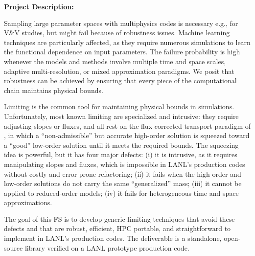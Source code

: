 \documentclass[12pt,twoside]{paper}
\begin{document}
\textbf{Project Description:} 

\vspace*{0.5\baselineskip}

Sampling large parameter spaces with multiphysics codes is necessary e.g.,
for V\&V studies, but might fail because of robustness issues. Machine
learning techniques are particularly affected, as they require numerous
simulations to learn the functional dependence on input parameters. The
failure probability is high whenever the models and methods involve
multiple time and space scales, adaptive multi-resolution, or mixed
approximation paradigms. We posit that robustness can be achieved by
ensuring that every piece of the computational chain maintains physical
bounds.

\vspace*{0.5\baselineskip}

Limiting is the common tool for maintaining physical bounds in simulations.
Unfortunately, most known limiting are specialized and intrusive: they
require adjusting slopes or fluxes, and all rest on the flux-corrected
transport paradigm of \cite{Boris_Book_JCP_1973, Zalesak_1979}, in which a
“non-admissible” but accurate high-order solution is squeezed toward a
“good” low-order solution until it meets the required bounds. The squeezing
idea is powerful, but it has four major defects: (i) it is intrusive, as it
requires manipulating slopes and fluxes, which is impossible in LANL’s
production codes without costly and error-prone refactoring; (ii) it fails
when the high-order and low-order solutions do not carry the same
“generalized” mass; (iii) it cannot be applied to reduced-order models;
(iv) it fails for heterogeneous time and space approximations.

\vspace*{0.5\baselineskip}

The goal of this FS is to develop generic limiting techniques that avoid
these defects and that are robust, efficient, HPC portable, and
straightforward to implement in LANL’s production codes. The deliverable is
a standalone, open-source library verified on a LANL prototype production
code.

\vspace*{\baselineskip}



\end{document}
